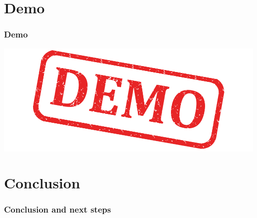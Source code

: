 \section{Demo}

\begin{frame}
  \frametitle{Demo}
  \includegraphics[width=\textwidth]{images/demo}
\end{frame}

\section{Conclusion}

\begin{frame}
  \frametitle{Conclusion and next steps}
\end{frame}


